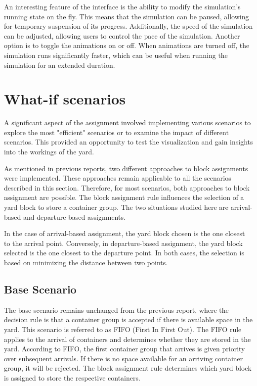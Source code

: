 \documentclass{article}
\begin{document}
An interesting feature of the interface is the ability to modify the
simulation's running state on the fly. This means that the simulation can be
paused, allowing for temporary suspension of its progress. Additionally, the
speed of the simulation can be adjusted, allowing users to control the pace of
the simulation. Another option is to toggle the animations on or off. When
animations are turned off, the simulation runs significantly faster, which can
be useful when running the simulation for an extended duration.

\section{What-if scenarios}
A significant aspect of the assignment involved implementing various scenarios
to explore the most "efficient" scenarios or to examine the impact of different
scenarios. This provided an opportunity to test the visualization and gain
insights into the workings of the yard.

As mentioned in previous reports, two different approaches to block assignments
were implemented. These approaches remain applicable to all the scenarios
described in this section. Therefore, for most scenarios, both approaches to
block assignment are possible. The block assignment rule influences the
selection of a yard block to store a container group. The two situations
studied here are arrival-based and departure-based assignments.

In the case of arrival-based assignment, the yard block chosen is the one
closest to the arrival point. Conversely, in departure-based assignment, the
yard block selected is the one closest to the departure point. In both cases,
the selection is based on minimizing the distance between two points.

\subsection{Base Scenario}
The base scenario remains unchanged from the previous report, where the
decision rule is that a container group is accepted if there is available space
in the yard. This scenario is referred to as FIFO (First In First Out). The
FIFO rule applies to the arrival of containers and determines whether they are
stored in the yard. According to FIFO, the first container group that arrives
is given priority over subsequent arrivals. If there is no space available for
an arriving container group, it will be rejected. The block assignment rule
determines which yard block is assigned to store the respective containers.
\end{document}
